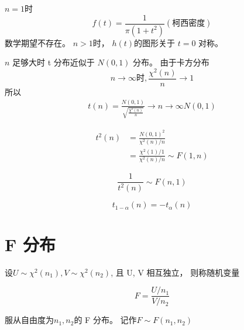 \begin{corollary}[t 分布的概率密度函数]
    $n = 1$时 \begin{equation}f(t)=\frac{1}{\pi (1+t^2)}(柯西密度)\end{equation} 数学期望不存在。
    $n>1$时， $h(t)$的图形关于 $t=0$ 对称。
\end{corollary}

\begin{corollary}
    $n$ 足够大时 t 分布近似于 $N(0,1)$ 分布。 由于卡方分布
    \begin{equation}
        n\to \infty 时, \frac{\chi^2(n)}{n} \to 1
    \end{equation}
    所以
    \begin{equation}
        \begin{aligned}
            t(n) =
            {\frac{N(0,1)}{\sqrt{\frac{\chi^2(n)}{n}}}
            \rightarrow{n \to \infty}
            N(0,1)}
        \end{aligned}
    \end{equation}
\end{corollary}

\begin{corollary}[与 F 分布的关系]
    \begin{equation}
        \begin{aligned}
            t^2(n) & = \frac{N(0,1)^2}{\chi^2 (n)/n}                    \\
                   & = \frac{\chi ^2(1)/1}{ \chi ^2(n) / n} \sim F(1,n)
        \end{aligned}
    \end{equation}

    \begin{equation}
        \frac{1}{t^2(n)} \sim F(n,1)
    \end{equation}
\end{corollary}

\begin{definition}[t 分布的上分位点]
    \begin{equation}
        t_{1-\alpha} (n) = -t_\alpha(n)
    \end{equation}
\end{definition}

\section{F 分布}

\begin{definition}[F 分布]
    设$U \sim \chi^2(n_1), V \sim \chi^2(n_2)$, 且 U, V 相互独立， 则称随机变量

    \begin{equation}
        F = \frac{U/n_1}{V/n_2}
    \end{equation}

    服从自由度为$n_1,n_2$的 F 分布。 记作$F \sim F(n_1,n_2)$
\end{definition}

